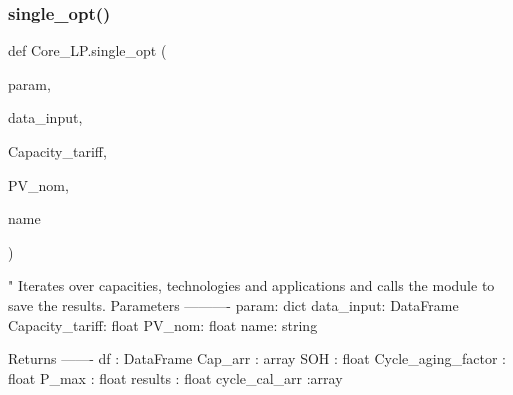 \subsubsection{\texorpdfstring{single\+\_\+opt()}{single\_opt()}}
{\footnotesize\ttfamily def Core\+\_\+\+L\+P.\+single\+\_\+opt (\begin{DoxyParamCaption}\item[{}]{param,  }\item[{}]{data\+\_\+input,  }\item[{}]{Capacity\+\_\+tariff,  }\item[{}]{P\+V\+\_\+nom,  }\item[{}]{name }\end{DoxyParamCaption})}

\begin{DoxyVerb}"
Iterates over capacities, technologies and applications and calls the module to save the results.
Parameters
----------
param: dict
data_input: DataFrame
Capacity_tariff: float
PV_nom: float
name: string

Returns
-------
df : DataFrame
Cap_arr : array
SOH : float
Cycle_aging_factor : float
P_max : float
results : float
cycle_cal_arr :array
\end{DoxyVerb}
 